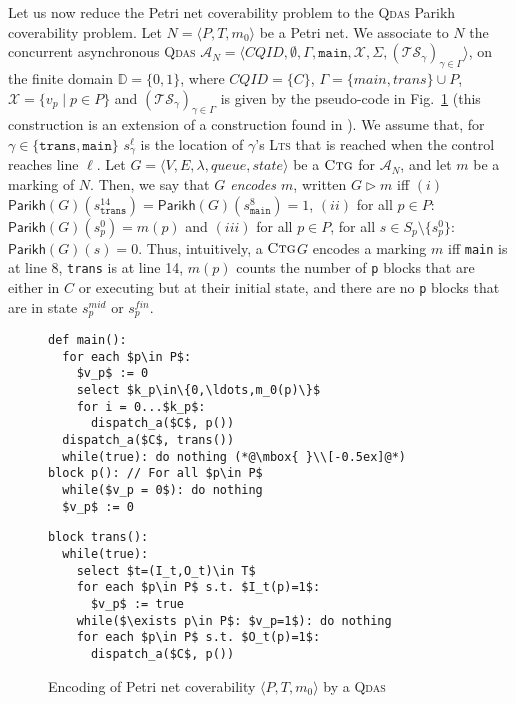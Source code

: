 \documentclass[runningheads,oribibl,]{article}
\newcommand{\tuple}[1]{\langle#1\rangle\xspace}
\newcommand{\Aa}{\ensuremath{\mathcal{A}}\xspace}
\newcommand{\Ts}{\ensuremath{\mathcal{TS}}\xspace}
\newcommand{\Xx}{\ensuremath{\mathcal{X}}\xspace}
\newcommand{\DD}{\ensuremath{\mathbb{D}}\xspace}
\newcommand{\CQID}{CQID\xspace}
\newcommand{\lts}{\textsc{Lts}\xspace}
\newcommand{\qdas}{\textsc{Qdas}\xspace}
\newcommand{\queue}{\ensuremath{\textit{queue}}}
\newcommand{\state}{\ensuremath{\textit{state}}}
\newcommand{\ctg}{\ensuremath{\textsc{Ctg}}\xspace}
\newcommand{\Parikh}{\ensuremath{\mathsf{Parikh}}}
\newcommand{\mystate}[2]{\ensuremath{s^{#1}_{\mathtt{#2}}}}
\begin{document}
Let us now reduce the Petri net coverability problem to the \qdas
Parikh coverability problem. Let $N=\tuple{P,T,m_0}$ be a Petri net. We
associate to $N$ the concurrent asynchronous \qdas
${\Aa}_N=\tuple{\CQID, \emptyset, \Gamma, \mathtt{main}, \Xx, \Sigma,
  (\Ts_\gamma)_{\gamma\in\Gamma}}$, on the finite domain
$\DD=\{0,1\}$, where $\CQID=\{C\}$, $\Gamma=\{main,trans\}\cup P$,
$\Xx=\{v_p\mid p\in P\}$ and $(\Ts_\gamma)_{\gamma\in\Gamma}$ is given
by the pseudo-code in Fig.~\ref{fig:simulossyPN} (this construction is
an extension of a construction found in \cite{ganty-p-2010--a}).  We
assume that, for $\gamma\in\{\mathtt{trans},\mathtt{main}\}$
$\mystate{\ell}{\gamma}$ is the location of $\gamma$'s \lts that is
reached when the control reaches line $\ell$. Let $G=\tuple{V, E,
  \lambda, \queue, \state}$ be a \ctg for $\Aa_N$, and let $m$ be a
marking of $N$. Then, we say that \emph{$G$ encodes $m$}, written
$G\rhd m$ iff $(i)$
$\Parikh(G)(\mystate{14}{trans})=\Parikh(G)(\mystate{8}{main})=1$,
$(ii)$ for all $p\in P$: $\Parikh(G)(s^0_p)=m(p)$ and $(iii)$ for all
$p\in P$, for all $s\in S_p\setminus\{s^0_p\}$:
$\Parikh(G)(s)=0$. Thus, intuitively, a \ctg $G$ encodes a marking $m$
iff \texttt{main} is at line 8, \texttt{trans} is at line 14, $m(p)$
counts the number of \texttt{p} blocks that are either in $C$ or
executing but at their initial state, and there are no \texttt{p}
blocks that are in state $s_p^{mid}$ or $s_p^{fin}$.

\begin{figure}[!t]
  \centering
  \begin{minipage}[t]{.45\linewidth}
    \begin{lstlisting}[numberblanklines=false]
def main():
  for each $p\in P$:
    $v_p$ := 0
    select $k_p\in\{0,\ldots,m_0(p)\}$
    for i = 0...$k_p$:
      dispatch_a($C$, p())
  dispatch_a($C$, trans())
  while(true): do nothing (*@\mbox{ }\\[-0.5ex]@*)
block p(): // For all $p\in P$
  while($v_p = 0$): do nothing
  $v_p$ := 0
\end{lstlisting}
\end{minipage}
\begin{minipage}[t]{.45\linewidth}
  \begin{lstlisting}[firstnumber=last]
block trans():
  while(true):
    select $t=(I_t,O_t)\in T$
    for each $p\in P$ s.t. $I_t(p)=1$:
      $v_p$ := true
    while($\exists p\in P$: $v_p=1$): do nothing
    for each $p\in P$ s.t. $O_t(p)=1$:
      dispatch_a($C$, p())
    \end{lstlisting}
  \end{minipage}
\caption{Encoding of Petri net coverability $\tuple{P, T, m_0}$ by a \qdas}
  \label{fig:simulossyPN}
\end{figure}
\end{document}
